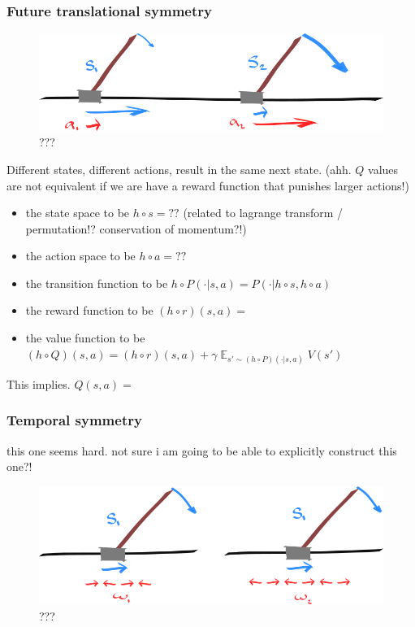 \subsubsection{Future translational symmetry}

\begin{figure}[!h]
\centering
\includegraphics[width=1\textwidth,height=0.25\textheight]{../../pictures/drawings/cart-pole-state.png}
\caption{???}
\end{figure}

Different states, different actions, result in the same next state.
(ahh. $Q$ values are not equivalent if we are have a reward function that punishes larger actions!)

\begin{itemize}
\tightlist
  \item the state space to be $h\circ s = ??$ (related to lagrange transform / permutation!? conservation of momentum?!)
  \item the action space to be $h\circ a = ??$
  \item the transition function to be $h\circ P(\cdot|s, a) = P(\cdot|h \circ s, h \circ a)$
  \item the reward function to be $(h \circ r)(s, a) = $
  \item the value function to be $(h\circ Q)(s, a) = (h \circ r)(s, a) + \gamma \mathop{\mathbb E}_{s' \sim (h\circ P)(\cdot|s, a)} V(s')$
\end{itemize}

This implies. $Q(s, a) = $


\subsubsection{Temporal symmetry}

{\color{red} this one seems hard. not sure i am going to be able to explicitly construct this one?!}


\begin{figure}[!h]
\centering
\includegraphics[width=1\textwidth,height=0.25\textheight]{../../pictures/drawings/cart-pole-temporal-approx.png}
\caption{???}
\end{figure}

